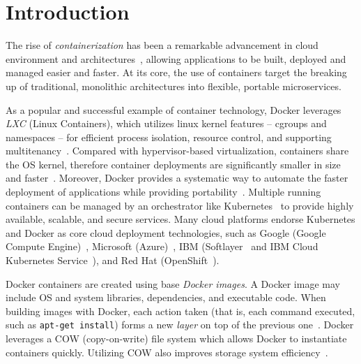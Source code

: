 \section{Introduction}
 \label{sec:intro}

\vspace{-2pt}



The rise of \emph{containerization} has been a remarkable advancement in 
cloud environment and architectures~\cite{dockerbook},
allowing applications to be built, deployed and managed easier and faster.
At its core, the use of containers target the breaking up of traditional, monolithic architectures into flexible, portable microservices. 

As a popular and successful example of container technology,
Docker leverages \emph{LXC} (Linux Containers), which utilizes linux kernel features -- 
cgroups and namespaces -- for 
efficient process isolation, resource control, and supporting multitenancy~\cite{slacker, 7158965, cntr}.
Compared with hypervisor-based virtualization,
containers share the OS kernel,
therefore container deployments are significantly smaller in size and faster~\cite{7819678}.
Moreover, Docker provides a systematic way to automate the faster deployment of applications while providing portability~\cite{docker}. Multiple running containers can be managed by an orchestrator like Kubernetes~\cite{kubernetes} to provide highly available, scalable, and secure services.
Many cloud platforms endorse Kubernetes and Docker 
as core cloud deployment technologies,
such as Google (Google Compute Engine)~\cite{googlecengine},
Microsoft (Azure)~\cite{azurec},
IBM (Softlayer~\cite{softlayer} and IBM Cloud Kubernetes Service~\cite{ibmkube}),
 and
Red Hat (OpenShift~\cite{openshift}).
 
Docker containers are created using base \emph{Docker images}. 
A Docker image may include OS and system libraries, dependencies, and executable code. 
When building images with Docker, 
each action taken (that is, each command executed, such as \texttt{apt-get install}) forms a new \emph{layer} on top of the previous one~\cite{docker}. 
Docker leverages a COW (copy-on-write) file system 
which allows Docker to instantiate containers quickly. 
Utilizing COW also improves storage system efficiency~\cite{docker, UnionFS}. 

